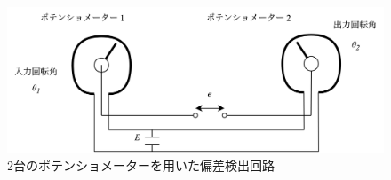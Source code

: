 \begin{figure}
	\centering
	\includegraphics[width=0.8\linewidth]{src/figures/potentio-meter-2/potentio-meter-2.png}
	\caption{2台のポテンショメーターを用いた偏差検出回路}\label{fig:potentio-meter-detection}
\end{figure}
